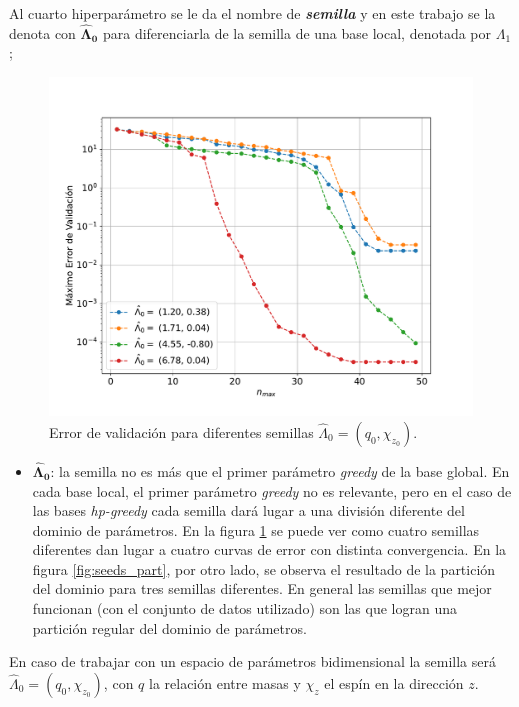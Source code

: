 Al cuarto hiperparámetro se le da el nombre de \textit{\textbf{semilla}} y en este trabajo se la denota con $\bm{\hat{\Lambda}_0}$ para diferenciarla de la semilla de una base local, denotada por $\Lambda_1$;

\begin{figure}[h!]
\centering
\includegraphics[width=.8\columnwidth ,trim={1.1cm, 1.1cm, 1.2cm, 1.2cm}]{figs/Semillas_v_nmax_2D.pdf}
\caption{Error de validación para diferentes semillas $\hat{\Lambda}_0 = (q_0, \chi_{z_0})$.}
\label{fig:seeds0}
\end{figure}

\begin{itemize}
\item $\bm{\hat{\Lambda}_0}$: la semilla no es más que el primer parámetro \textit{greedy} de la base global. En cada base local, el primer parámetro \textit{greedy} no es relevante, pero en el caso de las bases \textit{hp-greedy} cada semilla dará lugar a una división diferente del dominio de parámetros. En la figura \ref{fig:seeds0} se puede ver como cuatro semillas diferentes dan lugar a cuatro curvas de error con distinta convergencia. En la figura \ref{fig:seeds_part}, por otro lado, se observa el resultado de la partición del dominio para tres semillas diferentes. En general las semillas que mejor funcionan (con el conjunto de datos utilizado) son las que logran una partición regular del dominio de parámetros. 
\end{itemize}

En caso de trabajar con un espacio de parámetros bidimensional la semilla será $\hat{\Lambda}_0 = (q_0, \chi_{z_0})$,  con $q$ la relación entre masas y $\chi_z$ el espín en la dirección $z$. 

